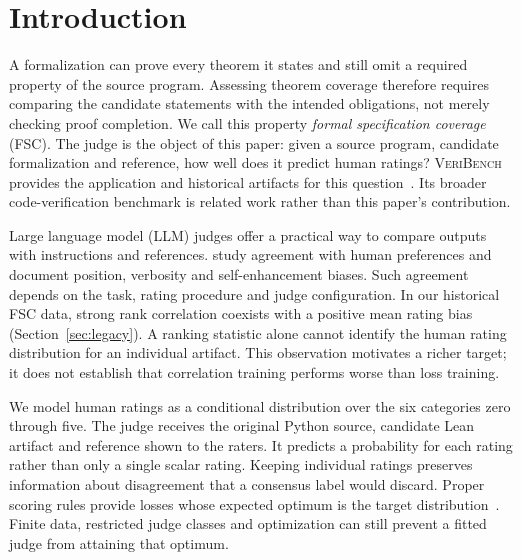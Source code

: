 \section{Introduction}
A formalization can prove every theorem it states and still omit a required property of the source program.
Assessing theorem coverage therefore requires comparing the candidate statements with the intended obligations, not merely checking proof completion.
We call this property \emph{formal specification coverage} (FSC).
The judge is the object of this paper: given a source program, candidate formalization and reference, how well does it predict human ratings?
\textsc{VeriBench} provides the application and historical artifacts for this question~\citep{veribench2026}.
Its broader code-verification benchmark is related work rather than this paper's contribution.

Large language model (LLM) judges offer a practical way to compare outputs with instructions and references.
\citet{zheng2023judging} study agreement with human preferences and document position, verbosity and self-enhancement biases.
Such agreement depends on the task, rating procedure and judge configuration.
In our historical FSC data, strong rank correlation coexists with a positive mean rating bias (Section~\ref{sec:legacy}).
A ranking statistic alone cannot identify the human rating distribution for an individual artifact.
This observation motivates a richer target; it does not establish that correlation training performs worse than loss training.

We model human ratings as a conditional distribution over the six categories zero through five.
The judge receives the original Python source, candidate Lean artifact and reference shown to the raters.
It predicts a probability for each rating rather than only a single scalar rating.
Keeping individual ratings preserves information about disagreement that a consensus label would discard.
Proper scoring rules provide losses whose expected optimum is the target distribution~\citep{gneiting2007strictly}.
Finite data, restricted judge classes and optimization can still prevent a fitted judge from attaining that optimum.


